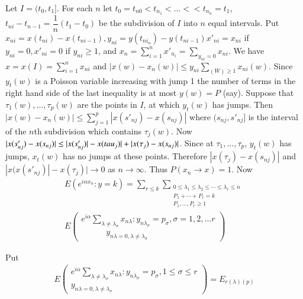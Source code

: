 Let $I=(t_0,t_1]$. For each $n$ let $t_0=t_{n0} < t_{n_{1}}< \ldots <
    <t_{n_n}=t_1$, $t_{ni}-t_{n-1}=\dfrac{1}{n}(t_1-t_0)$ be the
    subdivision of $I$ into $n$ equal intervals. Put
    $x_{ni}=x(t_{ni})-x(t_{ni-1}),y_{ni}=y(t_{ni_n})-y(t_{ni-1})x'_{ni}=x_{ni}$
    if $y_{ni}=0,x'_{ni}=0$ if $y_{ni} \geq 1$, and
    $x_n=\sum\limits_{i=1}^n x'_{n_i}=\sum \limits _{y_{ni}=0}x_{ni}$. We have
    $x=x(I)=\sum \limits^n_{i=1}x_{ni}$ and $|x(w)-x_n(w)|\leq
    y_{ni}\sum \limits_{(W)\geq 1} x_{ni}(w)$. Since $y_t(w)$ is a
    Poisson variable increasing with jump 1 the number of terms in the
    right hand side of the last 
    inequality is at most  $y(w)=P$
    (say). Suppose that $\tau_1(w),\ldots ,\tau_p (w)$ are the points
    in $I$, at which $y_t(w)$ has jumps. Then $|x(w)-x_n(w)|\leq \sum
    \limits^p_{j=1}|x(s'_{nj})-x(s_{nj})|$ where $(s_{nj},s'_{nj}]$ is
the interval of the $n$th subdivision which contains $\tau_j(w)$. Now
$|x(s'_{nj})-x(s_{nj})|\leq
|x(s'_{nj})|-x(\\tau_j)|+|x(\tau_j)-x(s_{nj})|$. Since at $\tau_1, \ldots
,\tau_p$, $y_t(w)$ has jumps, $x_t(w)$ has no jumps at these
points. Therefore $|x(\tau_j)-x(s_{nj})|$ and 
$|x(x(s'_{nj})|-x(\tau_j)| \to 0$\pageoriginale 
as $n \to \infty$. Thus $P(x_n \to
x)=1$. Now 
\begin{gather*}
E(e^{i \alpha x_n}:y=k)  = \sum_{r \leq k}\sum_{\substack{0 \leq
    \lambda_1 \leq \lambda_2 
      \leq \cdots \leq \lambda_r \leq n\\{P_1+\cdots+
        P_r=k}\\{P_1,\ldots, P_r\geq 1}}}\\ 
 E \begin{pmatrix}
    e^{i \alpha}\sum_{\lambda \neq \lambda_\sigma}x_{n \lambda}:y_{n
        \lambda_ \sigma}=p_\sigma,\sigma=1,2, \ldots r\\ 
    \qquad \quad y_{n \lambda=0 ,\lambda \neq \lambda_ \sigma}
  \end{pmatrix}
\end{gather*}


Put
\begin{gather*}
  E
\begin{pmatrix}
e^{i \alpha}\sum_{\lambda \neq \lambda_ \sigma}x_{n \lambda}:y_{n
      \lambda_ \sigma}=p_ \sigma, 1 \leq \sigma \leq r
    \\
  y_{n \lambda=0 ,\lambda \neq \lambda_ \sigma}
\end{pmatrix}
=E_{r(\lambda)(p)}
\end{gather*}

